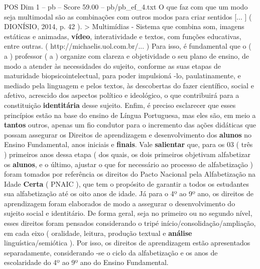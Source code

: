 \begin{textsample}{POS Dim 1 – pb – Score 59.00 – pb/pb\_ef\_4.txt}
O que faz com que um modo seja multimodal são as combinações com outros modos para criar sentidos [... ] ( DIONÍSIO, 2014, p. 42 ). > Multimídias - Sistema que combina som, imagens estáticas e animadas, \textbf{vídeo}, interatividade e textos, com funções educativas, entre outras. ( http://michaelis.uol.com.br/... ) Para isso, é fundamental que o ( a ) professor ( a ) organize com clareza e objetividade o seu plano de ensino, de modo a atender às necessidades do sujeito, conforme as suas etapas de maturidade biopsicointelectual, para poder impulsioná -lo, paulatinamente, e mediado pela linguagem e pelos textos, às descobertas do fazer científico, social e afetivo, acrescido dos aspectos político e ideológico, o que contribuirá para a constituição \textbf{identitária} desse sujeito.
Enfim, é preciso esclarecer que esses princípios estão na base do ensino de Língua Portuguesa, mas eles são, em meio a \textbf{tantos} outros, apenas um fio condutor para o incremento das ações didáticas que possam assegurar os Direitos de aprendizagem e desenvolvimento dos \textbf{alunos} no Ensino Fundamental, anos iniciais e \textbf{finais}.
Vale \textbf{salientar} que, para os 03 ( três ) primeiros anos dessa etapa ( dos quais, os dois primeiros objetivam alfabetizar os \textbf{alunos}, e o último, ajustar o que for necessário ao processo de alfabetização ) foram tomados por referência os direitos do Pacto Nacional pela Alfabetização na Idade \textbf{Certa} ( PNAIC ), que tem o propósito de garantir a todos os estudantes sua alfabetização até os oito anos de idade.
Já para o 4º ao 9º ano, os direitos de aprendizagem foram elaborados de modo a assegurar o desenvolvimento do sujeito social e identitário.
De forma geral, seja no primeiro ou no segundo nível, esses direitos foram pensados considerando o tripé início/consolidação/ampliação, em cada eixo ( oralidade, leitura, produção textual e \textbf{análise} linguística/semiótica ).
Por isso, os direitos de aprendizagem estão apresentados separadamente, considerando -se o ciclo da alfabetização e os anos de escolaridade do 4º ao 9º ano do Ensino Fundamental.

\end{textsample}
